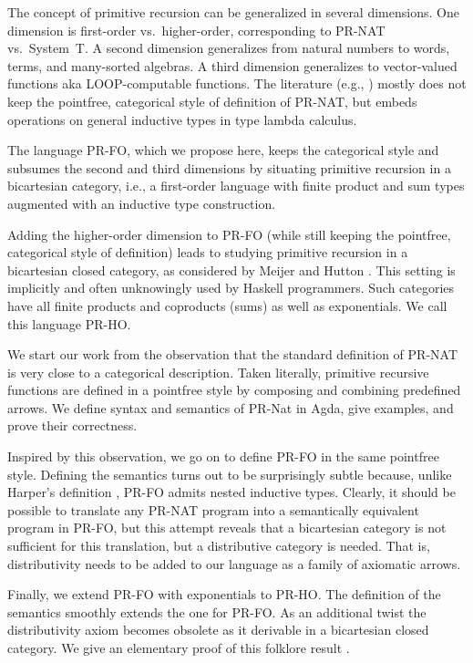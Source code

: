 \documentclass[a4paper,USenglish,cleveref, autoref, thm-restate]{lipics-v2021}
\begin{document}
The concept of primitive recursion can be generalized in several
dimensions. One dimension is first-order vs.\ higher-order,
corresponding to PR-NAT vs.\ System~T. A second dimension generalizes
from natural numbers to words, terms, and many-sorted algebras. A third
dimension generalizes to vector-valued functions aka LOOP-computable
functions. The literature (e.g.,
\cite{DBLP:books/cu/Ha2016,DBLP:conf/fpca/MeijerFP91,DBLP:conf/fpca/MeijerH95})
mostly does not keep the pointfree, categorical style of definition of
PR-NAT, but embeds operations on general inductive types in type
lambda calculus.

The language PR-FO, which we propose here, keeps the categorical style
and subsumes the second and third dimensions by
situating primitive recursion in a bicartesian category, i.e., a
first-order language with finite product and sum types augmented with
an inductive type construction.

Adding the higher-order dimension to PR-FO (while still keeping the
pointfree, categorical style of definition) leads to studying
primitive recursion in a bicartesian closed category, as considered
by Meijer and Hutton \cite{DBLP:conf/fpca/MeijerH95}. This setting is
implicitly and often unknowingly used by Haskell programmers. Such
categories have all finite products and coproducts (sums) as well as
exponentials. We call this language PR-HO.

We start our work from the observation that the standard definition of
PR-NAT is very close to a categorical description. Taken literally,
primitive recursive functions are defined in a pointfree style by
composing and combining predefined arrows. We define syntax and
semantics of PR-Nat in Agda, give examples, and prove their correctness.

Inspired by this observation, we go on to define PR-FO in the same
pointfree style. Defining the semantics turns out to be surprisingly
subtle because, unlike Harper's definition \cite[Chapter
15]{DBLP:books/cu/Ha2016}, PR-FO admits nested inductive types.
Clearly, it should be possible to translate any PR-NAT program into a
semantically equivalent program in PR-FO, but this attempt reveals
that a bicartesian category is not sufficient for this translation,
but a distributive category is needed. That is, distributivity needs
to be added to our language as a family of axiomatic arrows.

Finally, we extend PR-FO with exponentials to PR-HO. The definition
of the semantics smoothly extends the one for PR-FO. As an
additional twist the distributivity axiom becomes obsolete as it derivable in
a bicartesian closed category. We give an elementary proof of this
folklore result \cite{https://doi.org/10.48550/arxiv.1406.0961}. 
\end{document}
